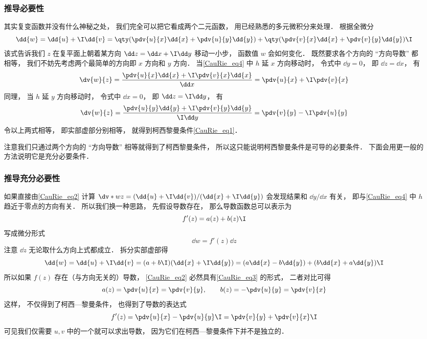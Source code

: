 \subsubsection{推导必要性}
其实复变函数并没有什么神秘之处， 我们完全可以把它看成两个二元函数， 用已经熟悉的多元微积分来处理． 根据全微分
\begin{equation}\label{CauRie_eq2}
\dd{w} = \dd{u} + \I \dd{v} = \qty(\pdv{u}{x} \dd{x} + \pdv{u}{y} \dd{y}) + \qty(\pdv{v}{x} \dd{x} + \pdv{v}{y} \dd{y})\I
\end{equation}
该式告诉我们 $z$ 在复平面上朝着某方向 $\dd z = \dd x + \I \dd y$ 移动一小步， 函数值 $w$ 会如何变化． 既然要求各个方向的 “方向导数” 都相等， 我们不妨先考虑两个最简单的方向即 $x$ 方向和 $y$ 方向． 当\autoref{CauRie_eq4} 中 $h$ 延 $x$ 方向移动时， 令式中 $\dd y = 0$， 即 $\dd z = \dd x$， 有
\begin{equation}
\dv{w}{z} = \frac{\pdv{u}{x} \dd{x} +  \I\pdv{v}{x} \dd{x}}{\dd x} = \pdv{u}{x} +  \I\pdv{v}{x}
\end{equation}
同理， 当 $h$ 延 $y$ 方向移动时， 令式中 $\dd x = 0$， 即 $\dd z = \I\dd y$， 有
\begin{equation}
\dv{w}{z} = \frac{\pdv{u}{y} \dd{y} + \I\pdv{v}{y} \dd{y}}{\I \dd y} = \pdv{v}{y} -\I \pdv{u}{y}
\end{equation}
令以上两式相等， 即实部虚部分别相等， 就得到柯西黎曼条件\autoref{CauRie_eq1}．

注意我们只通过两个方向的 “方向导数” 相等就得到了柯西黎曼条件， 所以这只能说明柯西黎曼条件是可导的必要条件． 下面会用更一般的方法说明它是充分必要条件．

\subsubsection{推导充分必要性}
如果直接由\autoref{CauRie_eq2} 计算 $\dv*{w}{z} = (\dd{u} + \I \dd{v})/(\dd{x} + \I \dd{y})$ 会发现结果和 $\dd{y}/\dd{x}$ 有关， 即与\autoref{CauRie_eq4} 中 $h$ 趋近于零点的方向有关． 所以我们换一种思路， 先假设导数存在， 那么导数函数总可以表示为
\begin{equation}
f'(z) = a(z) + b(z)\I
\end{equation}
写成微分形式
\begin{equation}
\dd{w} = f'(z)\dd{z}
\end{equation}
注意 $\dd z$ 无论取什么方向上式都成立． 拆分实部虚部得
\begin{equation}\label{CauRie_eq3}
\dd{w} = \dd{u} + \I \dd{v} = (a + b\I)(\dd{x} + \I\dd{y}) = (a \dd{x} - b\dd{y}) + (b \dd{x} + a\dd{y})\I
\end{equation}
所以如果 $f(z)$ 存在（与方向无关的）导数， \autoref{CauRie_eq2} 必然具有\autoref{CauRie_eq3} 的形式， 二者对比可得
\begin{equation}
a(z) = \pdv{u}{x} = \pdv{v}{y}, \qquad
b(z) = -\pdv{u}{y} = \pdv{v}{x}
\end{equation}
这样， 不仅得到了柯西—黎曼条件， 也得到了导数的表达式
\begin{equation}
f'(z) = \pdv{u}{x} -\pdv{u}{y} \I = \pdv{v}{y} + \pdv{v}{x}\I
\end{equation}
可见我们仅需要 $u, v$ 中的一个就可以求出导数， 因为它们在柯西—黎曼条件下并不是独立的．


